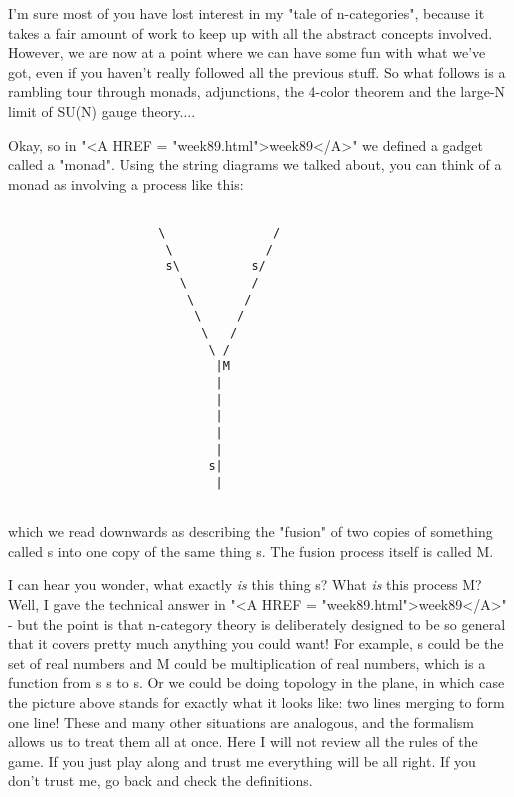 



I'm sure most of you have lost interest in my "tale of n-categories",
because it takes a fair amount of work to keep up with all the abstract
concepts involved.  However, we are now at a point where we can have
some fun with what we've got, even if you haven't really followed all
the previous stuff.  So what follows is a rambling tour through monads,
adjunctions, the 4-color theorem and the large-N limit of SU(N) gauge
theory....

Okay, so in "<A HREF = "week89.html">week89</A>" we defined a gadget called a "monad".  Using
the string diagrams we talked about, you can think of a monad as
involving a process like this:



\begin{verbatim}

                     \               /
                      \             /
                      s\          s/
                        \         /
                         \       /
                          \     /
                           \   /
                            \ /
                             |M               
                             |
                             |
                             |
                             |
                             |
                            s|
                             |


\end{verbatim}
    
which we read downwards as describing the "fusion" of two copies of something 
called s into one copy of the same thing s.  The fusion process itself is 
called M.

I can hear you wonder, what exactly \emph{is} this thing s?  What 
\emph{is} this 
process M?  Well, I gave the technical answer in "<A HREF = "week89.html">week89</A>" - but the 
point is that n-category theory is deliberately designed to be so 
general that it covers pretty much anything you could want!  For example, 
s could be the set of real numbers and M could be multiplication of real 
numbers, which is a function from s \times  s to s.  Or we could be doing 
topology in the plane, in which case the picture above stands for exactly 
what it looks like: two lines merging to form one line!  These and many 
other situations are analogous, and the formalism allows us to treat them 
all at once.  Here I will not review all the rules of the game.  If you 
just play along and trust me everything will be all right.  If you
don't trust me, go back and check the definitions.  


